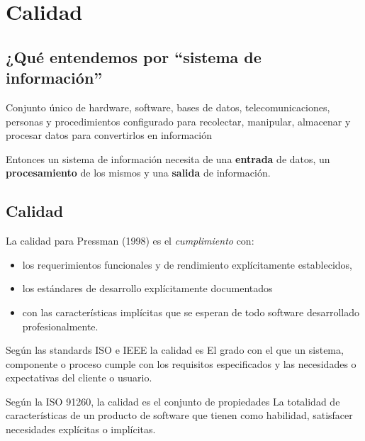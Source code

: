 \chapter{Calidad}

\section{¿Qué entendemos por ``sistema de información''}

\begin{definition}
   Conjunto único de hardware, software, bases de datos,
   telecomunicaciones, personas y procedimientos configurado
   para recolectar, manipular, almacenar y procesar datos para
   convertirlos en información
\end{definition}

Entonces un sistema de información necesita de una \textbf{entrada} de datos, un \textbf{procesamiento} de los mismos y una \textbf{salida} de información.

\section{Calidad}
\begin{definition}[Calidad - 1] 
   La calidad para Pressman (1998) es el \textit{cumplimiento} con:
   \begin{itemize}
      \item los requerimientos funcionales y de rendimiento explícitamente establecidos,
      \item los estándares de desarrollo explícitamente documentados
      \item con las características implícitas que se esperan de todo
      software desarrollado profesionalmente.
   \end{itemize}
\end{definition}

\begin{definition}[Calidad - 2]
   Según las standards ISO e IEEE la calidad es
   El grado con el que un sistema, componente o proceso
   cumple con los requisitos especificados y las necesidades o
   expectativas del cliente o usuario.
\end{definition}

\begin{definition}[Calidad - 3]
   Según la ISO 91260, la calidad es el conjunto de propiedades
La totalidad de características de un producto de software
que tienen como habilidad, satisfacer necesidades explícitas o
implícitas.
\end{definition}

